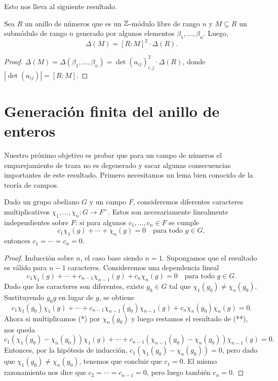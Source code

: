 Esto nos lleva al siguiente resultado.

\begin{proposicion}
  Sea $R$ un anillo de números que es un $\mathbb{Z}$-módulo libre de rango $n$
  y $M \subseteq R$ un submódulo de rango $n$ generado por algunos elementos
  $\beta_1,\ldots,\beta_n$. Luego,
  $$\Delta (M) = [R : M]^2 \cdot \Delta (R).$$

  \begin{proof}
    $\Delta (M) = \Delta (\beta_1,\ldots,\beta_n) = \det (a_{ij})_{i,j}^2 \cdot \Delta (R)$,
    donde $|\det (a_{ij})| = [R : M]$.
  \end{proof}
\end{proposicion}


\section{Generación finita del anillo de enteros}

Nuestro próximo objetivo es probar que para un campo de números
el emparejamiento de traza no es degenerado y sacar algunas consecuencias
importantes de este resultado.
Primero necesitamos un lema bien conocido de la teoría de campos.

\begin{lema}
  Dado un grupo abeliano $G$ y un campo $F$, consideremos diferentes caracteres
  multiplicativos $\chi_1,\ldots,\chi_n\colon G\to F^\times$. Estos son
  necesariamente linealmente independientes sobre $F$: si para algunos
  $c_1,\ldots,c_n \in F$ se cumple
  $$c_1 \chi_1 (g) + \cdots + \chi_n (g) = 0 \quad\text{para todo }g\in G,$$
  entonces $c_1 = \cdots = c_n = 0$.

  \begin{proof}
    Inducción sobre $n$, el caso base siendo $n = 1$. Supongamos que
    el resultado es válido para $n-1$ caracteres.
    Consideremos una dependencia lineal
    \[ \tag{*} c_1 \chi_1 (g) + \cdots + c_{n-1} \chi_{n-1} (g) + c_n \chi_n (g)
       = 0 \quad\text{para todo }g\in G. \]
    Dado que los caracteres son diferentes, existe $g_0 \in G$ tal que $\chi_1
    (g_0) \ne \chi_n (g_0)$. Sustituyendo $g_0 g$ en lugar de $g$, se obtiene
    \[ \tag{**} c_1 \chi_1 (g_0) \chi_1 (g) + \cdots +
       c_{n-1} \chi_{n-1} (g_0) \chi_{n-1} (g) + c_n \chi_n (g_0) \chi_n (g) = 0. \]
    Ahora si multiplicamos (*) por $\chi_n (g_0)$ y luego restamos el resultado
    de (**), nos queda
    \[ c_1 (\chi_1 (g_0) - \chi_n (g_0)) \chi_1 (g) + \cdots +
       c_{n-1} (\chi_{n-1} (g_0) - \chi_n (g_0)) \chi_{n-1} (g) = 0. \]
    Entonces, por la hipótesis de inducción,
    $c_1 (\chi_1 (g_0) - \chi_n (g_0)) = 0$, pero dado que
    $\chi_1 (g_0) \ne \chi_n (g_0)$, tenemos que concluir que $c_1 = 0$.
    El mismo razonamiento nos dice que $c_2 = \cdots = c_{n-1} = 0$, pero luego
    también $c_n = 0$.
  \end{proof}
\end{lema}

